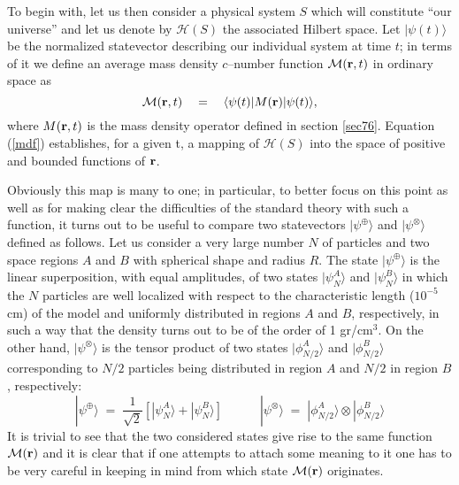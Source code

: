 \documentclass[10pt,a4paper]{article}
\begin{document}
To begin with, let us then consider a physical system $S$ which
will constitute ``our universe'' and let us denote by ${\mathcal
H}(S)$ the associated Hilbert space. Let $|\psi(t)\rangle$ be the
normalized statevector describing our individual system at time
$t$; in terms of it we define an average mass density $c$--number
function ${\mathcal M}({\bf r},t)$ in ordinary space as
\begin{equation} \label{mdf}
{\mathcal M}({\bf r},t) \quad = \quad \langle \psi(t)| M({\bf
r})|\psi(t)\rangle,
\end{equation}
where $M({\bf r},t)$ is the mass density operator defined in
section \ref{sec76}. Equation
(\ref{mdf}) establishes, for a given t, a mapping of ${\mathcal
H}(S)$ into the space of positive and bounded functions of ${\bf
r}$.

Obviously this map is many to one; in particular, to better focus
on this point as well as for making clear the difficulties of the
standard theory with such a function, it turns out to be useful to
compare two statevectors $|\psi^{\oplus}\rangle$ and
$|\psi^{\otimes}\rangle$  defined as follows. Let us consider a
very large number $N$ of particles and two space regions $A$ and
$B$ with spherical shape and radius $R$. The state
$|\psi^{\oplus}\rangle$  is the linear superposition, with equal
amplitudes, of two states $|\psi^{A}_{N}\rangle$ and
$|\psi^{B}_{N}\rangle$  in which the $N$ particles are well
localized with respect to the characteristic length ($10^{-5}$ cm)
of the model and uniformly distributed in regions $A$ and $B$,
respectively, in such a way that the density turns out to be of
the order of 1 gr/cm$^{3}$. On the other hand,
$|\psi^{\otimes}\rangle$ is the tensor product of two states
$|\phi^{A}_{N/2}\rangle$ and  $|\phi^{B}_{N/2}\rangle$
corresponding to $N/2$ particles being distributed in region $A$
and $N/2$ in region $B$, respectively:
\begin{equation}
|\psi^{\oplus}\rangle \; = \; \frac{1}{\sqrt{2}}\left[
|\psi^{A}_{N}\rangle + |\psi^{B}_{N}\rangle \right] \qquad\quad
|\psi^{\otimes}\rangle \; = \; |\phi^{A}_{N/2}\rangle\otimes
|\phi^{B}_{N/2}\rangle
\end{equation}
It is trivial to see that the two considered states give rise to
the same function ${\mathcal M}({\bf r})$ and it is clear that if
one attempts to attach some meaning to it one has to be very
careful in keeping in mind from which state ${\mathcal M}({\bf
r})$ originates.
\end{document}
